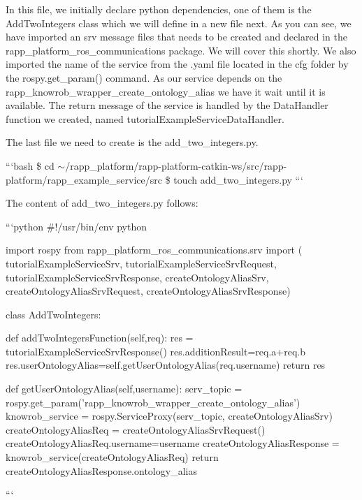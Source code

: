 In this file, we initially declare python dependencies, one of them is the Add\-Two\-Integers class which we will define in a new file next. As you can see, we have imported an srv message files that needs to be created and declared in the rapp\-\_\-platform\-\_\-ros\-\_\-communications package. We will cover this shortly. We also imported the name of the service from the .yaml file located in the cfg folder by the rospy.\-get\-\_\-param() command. As our service depends on the {\ttfamily rapp\-\_\-knowrob\-\_\-wrapper\-\_\-create\-\_\-ontology\-\_\-alias} we have it wait until it is available. The return message of the service is handled by the Data\-Handler function we created, named tutorial\-Example\-Service\-Data\-Handler.

The last file we need to create is the {\ttfamily add\-\_\-two\-\_\-integers.\-py}.

```bash \$ cd $\sim$/rapp\-\_\-platform/rapp-\/platform-\/catkin-\/ws/src/rapp-\/platform/rapp\-\_\-example\-\_\-service/src \$ touch add\-\_\-two\-\_\-integers.\-py ```

The content of {\ttfamily add\-\_\-two\-\_\-integers.\-py} follows\-:

```python \#!/usr/bin/env python

import rospy from rapp\-\_\-platform\-\_\-ros\-\_\-communications.\-srv import ( tutorial\-Example\-Service\-Srv, tutorial\-Example\-Service\-Srv\-Request, tutorial\-Example\-Service\-Srv\-Response, create\-Ontology\-Alias\-Srv, create\-Ontology\-Alias\-Srv\-Request, create\-Ontology\-Alias\-Srv\-Response)

class Add\-Two\-Integers\-: \begin{DoxyVerb}def addTwoIntegersFunction(self,req):
    res = tutorialExampleServiceSrvResponse()
    res.additionResult=req.a+req.b
    res.userOntologyAlias=self.getUserOntologyAlias(req.username)
    return res

def getUserOntologyAlias(self,username):
    serv_topic = rospy.get_param('rapp_knowrob_wrapper_create_ontology_alias')
    knowrob_service = rospy.ServiceProxy(serv_topic, createOntologyAliasSrv)
    createOntologyAliasReq = createOntologyAliasSrvRequest()
    createOntologyAliasReq.username=username
    createOntologyAliasResponse = knowrob_service(createOntologyAliasReq)
    return createOntologyAliasResponse.ontology_alias
\end{DoxyVerb}
 ```

